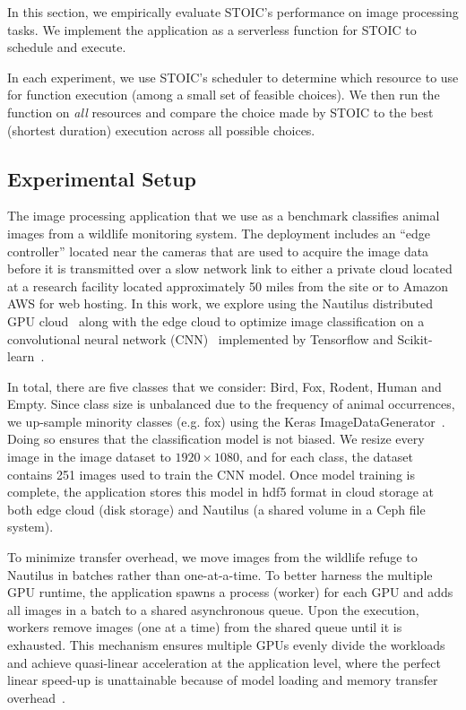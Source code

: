 In this section, we empirically evaluate STOIC's performance on image
processing tasks. We implement the application as a serverless function for
STOIC to schedule and execute.

In each experiment, we use STOIC's scheduler to determine which resource to
use for function execution (among a small set of feasible choices). We then
run the function on \textit{all} resources and compare the choice made by
STOIC to the best (shortest duration) execution across all possible choices.

\subsection{Experimental Setup}

The image processing application that we use as a benchmark classifies animal
images from a wildlife monitoring system.
The 
deployment includes an ``edge controller'' located near the cameras that are
used to acquire the image data before it is transmitted over a slow network
link to either a private cloud located at a research facility located
approximately 50 miles from the site or to Amazon AWS for web
hosting. In this work, we explore using the Nautilus distributed GPU
cloud~\cite{ref:nautilus} along with the edge cloud to optimize image
classification on a convolutional neural network (CNN)~\cite{ref:cnn}
implemented by Tensorflow and Scikit-learn~\cite{ref:scikit}. 

In total, there are five classes that we consider: Bird, Fox, Rodent, Human
and Empty. Since class size is unbalanced due to the frequency of animal
occurrences, we up-sample minority classes (e.g. fox) using the Keras
ImageDataGenerator~\cite{ref:keras}. Doing so ensures that the classification
model is not biased. We resize every image in the image dataset to $1920 \times
1080$, and for each class, the dataset contains 251 images used to train the
CNN model. Once model training is complete, the application stores this model
in hdf5 format in cloud storage at both edge cloud (disk storage) and Nautilus
(a shared volume in a Ceph file system). 

To minimize transfer overhead, we move images from 
the wildlife refuge
to Nautilus in
batches rather than one-at-a-time. To better harness the multiple GPU runtime,
the application spawns a process (worker) for each GPU and adds all images in
a batch to a shared asynchronous queue. Upon the execution, workers remove
images (one at a time) from the shared queue until it is exhausted. This
mechanism ensures multiple GPUs evenly divide the workloads and achieve
quasi-linear acceleration at the application level, where the perfect linear
speed-up is unattainable because of model loading and memory transfer
overhead~\cite{ref:multi_gpu}. 


